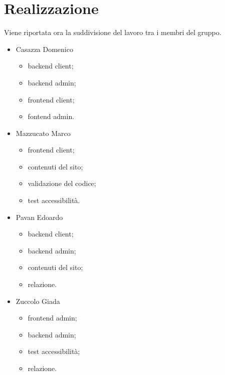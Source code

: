 \section{Realizzazione}
Viene riportata ora la suddivisione del lavoro tra i membri del gruppo.
\begin{itemize}
	\item Casazza Domenico
	\begin{itemize}
		\item backend client;
		\item backend admin;
		\item frontend client;
		\item fontend admin.
	\end{itemize}
	\item Mazzucato Marco
	\begin{itemize}
		\item frontend client;
		\item contenuti del sito;
		\item validazione del codice;
		\item test accessibilità.
	\end{itemize}	
	\item Pavan Edoardo
	\begin{itemize}
		\item backend client;
		\item backend admin;
		\item contenuti del sito;
		\item relazione.
	\end{itemize}
	\item Zuccolo Giada
	\begin{itemize}
		\item frontend admin;
		\item backend admin;
		\item test accessibilità;
		\item relazione.
	\end{itemize}
\end{itemize}